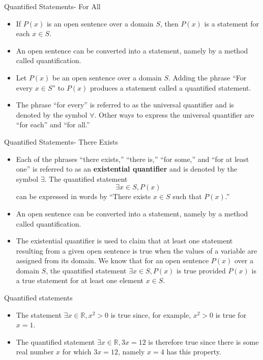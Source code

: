 \documentclass{beamer}
\begin{document}
\begin{frame}{Quantified Statements- For All}
\begin{itemize}
    \item If $P(x)$ is an open sentence over a domain $S$, then $P(x)$ is a statement for each $x \in S$.
    \item An open sentence can be converted into a statement, namely by a method called quantiﬁcation.
    \item Let $P(x)$ be an open sentence over a domain $S$. Adding the phrase ``For every $x \in S$'' to $P(x)$ produces a statement called a quantified statement.
    \item The phrase ``for every'' is referred to as the universal quantifier and is denoted by the symbol $\forall$. Other ways to express the universal quantifier are ``for each'' and ``for all.''
\end{itemize}
\end{frame}

\begin{frame}{Quantified Statements- There Exists}
\begin{itemize}
    \item Each of the phrases ``there exists,'' ``there is,'' ``for some,'' and ``for at least one'' is referred to as an \textbf{existential quantifier} and is denoted by the symbol $\exists$. The quantified statement
$$ \exists x \in S, P(x) $$
can be expressed in words by
``There exists $x \in S$ such that $P(x)$.''
    \item An open sentence can be converted into a statement, namely by a method called quantiﬁcation.
 \item The existential quantifier is used to claim that at least one statement resulting from a given open sentence is true when the values of a variable are assigned from its domain. We know that for an open sentence $P(x)$ over a domain $S$, the quantified statement $\exists x \in S, P(x)$ is true provided $P(x)$ is a true statement for at least one element $x \in S$.
 
\end{itemize}
\end{frame}

\begin{frame}{Quantified statements}
    \begin{itemize}

    \item The statement $\exists x \in \mathbb{R}, x^2 > 0$ is true since, for example, $x^2 > 0$ is true for $x = 1$.
    \item The quantified statement $\exists x \in \mathbb{R}, 3x = 12$ is therefore true since there is some real number $x$ for which $3x = 12$, namely $x = 4$ has this property.
\end{itemize}
\end{frame}
\end{document}
